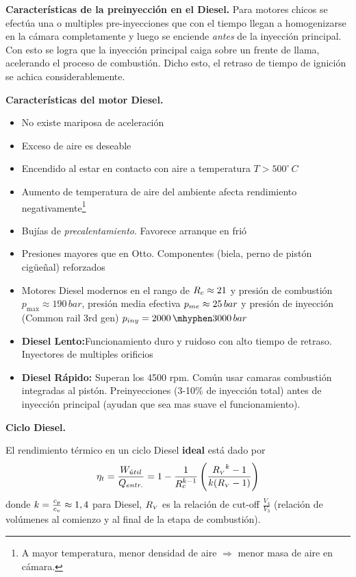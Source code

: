 \textbf{Características de la preinyección en el Diesel.} Para motores chicos se efectúa una o multiples pre-inyecciones que con el tiempo llegan a homogenizarse en la cámara completamente y luego se enciende \textit{antes} de la inyección principal. Con esto se logra que la inyección principal caiga sobre un frente de llama, acelerando el proceso de combustión. Dicho esto, el retraso de tiempo de ignición se achica considerablemente.

{\bf Características del motor Diesel.}
\begin{itemize}
    \item No existe mariposa de aceleración
    \item Exceso de aire es deseable
    \item Encendido al estar en contacto con aire a temperatura $T>500^\circ \,C$
    \item Aumento de temperatura de aire del ambiente afecta rendimiento negativamente\footnote{A mayor temperatura, menor densidad de aire $\Rightarrow$ menor masa de aire en cámara.}
    \item Bujías de \emph{precalentamiento}. Favorece arranque en frió
    \item Presiones mayores que en Otto. Componentes (biela, perno de pistón cigüeñal) reforzados
    \item Motores Diesel modernos en el rango de $R_c\approx 21$ y presión de combustión $p_{\max}\approx 190\,bar$, presión media efectiva $p_{me}\approx 25\, bar$ y presión de inyección (Common rail 3rd gen) $p_{iny}=2000\,\mhyphen 3000\, bar$
    \item \textbf{Diesel Lento:}Funcionamiento duro y ruidoso con alto tiempo de retraso. Inyectores de multiples orificios
    \item \textbf{Diesel Rápido:} Superan los 4500 rpm. Común usar camaras combustión integradas al pistón. Preinyecciones (3-10\% de inyección total) antes de inyección principal (ayudan que sea mas suave el funcionamiento).
\end{itemize}

{\bf Ciclo Diesel.} 

El rendimiento térmico en un ciclo Diesel \textbf{ideal} está dado por 
\[
\eta_t=\frac{W_{\acute{u}til}}{Q_{entr.}}=1-\frac{1}{R_c^{k-1}}\left( \frac{{R_{\mbox{\tiny $V$}}}^k-1}{k({R_{\mbox{\tiny $V$}}}-1)}\right)
\]
donde $k=\frac{c_p}{c_v}\approx1,4$ para Diesel, ${R_{\mbox{\tiny $V$}}}$ es la relación de cut-off $\frac{V_4}{V_3}$ (relación de volúmenes al comienzo y al final de la etapa de combustión).

